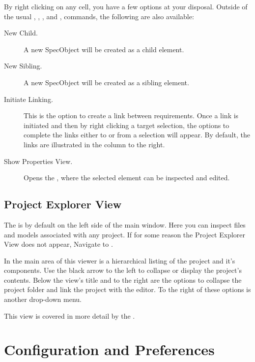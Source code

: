 By right clicking on any cell, you have a few options at your disposal. Outside of the usual , , ,  and , commands, the following are also available:

\begin{description}
\item
  [New Child.] A new SpecObject will be created as a child element.
\item
  [New Sibling.] A new SpecObject will be created as a sibling element.
\item
  [Initiate Linking.] This is the option to create a link between requirements. Once a link is initiated and then by right clicking a target selection, the options to complete the links either to or from a selection will appear. By default, the links are illustrated in the  column to the right. 
\item
  [Show Properties View.] Opens the , where the selected element can be inspected and edited.
\end{description}

\subsection{Project Explorer View}

The  is by default on the left side of the main window. Here you can inspect files and models associated with any project. If for some reason the Project Explorer View does not appear, Navigate to .

In the main area  of this viewer is a hierarchical listing of the project and it's components. Use the black arrow to the left to collapse or display the project's contents. Below the view's title and to the right are the options to collapse the project folder and link the project with the editor. To the right of these options is another drop-down menu.

This view is covered in more detail by the .

\section{Configuration and Preferences}

